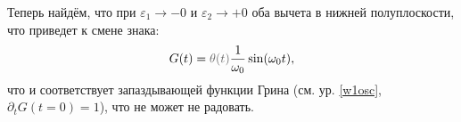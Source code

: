 Теперь найдём, что при $\varepsilon_1 \to -0$ и $\varepsilon_2 \to + 0$ оба вычета в нижней полуплоскости, что приведет к смене знака:
\begin{equation*}
    G(t) = \textcolor{grey}{\theta (t)} \frac{1}{\omega_0} \sin(\omega_0 t),
\end{equation*}
что и соответствует запаздывающей функции Грина (см. ур. \eqref{w1osc}, $\partial_t G(t=0) = 1$), что не может не радовать. 

